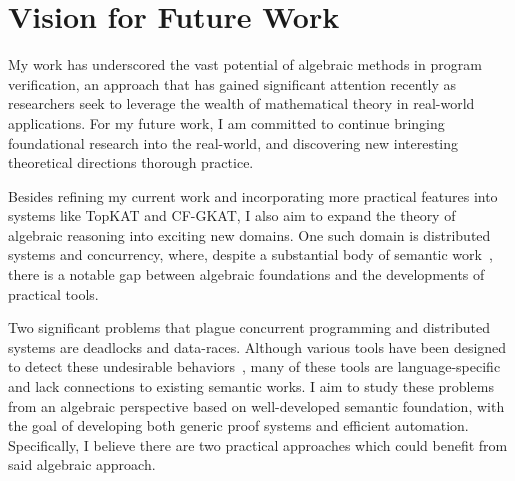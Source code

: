 \documentclass[11pt,a4paper,sans]{moderncv} %
\begin{document}

\newpage
\section{Vision for Future Work}

My work has underscored the vast potential of algebraic methods in program verification, an approach that has gained significant attention recently as researchers seek to leverage the wealth of mathematical theory in real-world applications.
For my future work, I am committed to continue bringing foundational research into the real-world, and discovering new interesting theoretical directions thorough practice.

Besides refining my current work and incorporating more practical features into systems like TopKAT and CF-GKAT, I also aim to expand the theory of algebraic reasoning into exciting new domains. 
One such domain is distributed systems and concurrency, where, despite a substantial body of semantic work~\cite{hoare_ConcurrentKleeneAlgebra_2011,kappe_ConcurrentKleeneAlgebra_2020,kappe_ConcurrentKleeneAlgebra_2018,wagemaker_PartiallyObservableConcurrent_2020,mciver_ProbabilisticConcurrentKleene_2013}, there is a notable gap between algebraic foundations and the developments of practical tools.

Two significant problems that plague concurrent programming and distributed systems are deadlocks and data-races.
Although various tools have been designed to detect these undesirable behaviors~\cite{williams_StaticDeadlockDetection_2005,masticola_StaticDetectionDeadlocks_1993,engler_RacerXEffectiveStatic_2003,naik_EffectiveStaticDeadlock_2009}, many of these tools are language-specific and lack connections to existing semantic works. 
I aim to study these problems from an algebraic perspective based on well-developed semantic foundation, with the goal of developing both generic proof systems and efficient automation. 
Specifically, I believe there are two practical approaches which could benefit from said algebraic approach.

\end{document}
